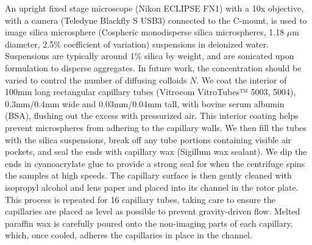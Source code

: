 An upright fixed stage microscope (Nikon ECLIPSE FN1) with a 10x objective, with a camera (Teledyne Blackfly S USB3) connected to the C-mount, is used to image silica microsphere (Cospheric monodisperse silica microspheres, 1.18 $\mu$m diameter, 2.5\% coefficient of variation) suspensions in deionized water. Suspensions are typically around 1\% silica by weight, and are sonicated upon formulation to disperse aggregates. In future work, the concentration should be varied to control the number of diffusing colloids $N$. We coat the interior of 100mm long rectangular capillary tubes (Vitrocom VitroTubes™ 5003, 5004), 0.3mm/0.4mm wide and 0.03mm/0.04mm tall, with bovine serum albumin (BSA), flushing out the excess with pressurized air. This interior coating helps prevent  microspheres from adhering to the capillary walls. We then fill the tubes with the silica suspensions, break off any tube portions containing visible air pockets, and seal the ends with capillary wax (Sigillum wax sealant). We dip the ends in cyanoacrylate glue to provide a strong seal for when the centrifuge spins the samples at high speeds. The capillary surface is then gently cleaned with isopropyl alcohol and lens paper and placed into its channel in the rotor plate. This process is repeated for 16 capillary tubes, taking care to ensure the capillaries are placed as level as possible to prevent gravity-driven flow. Melted paraffin wax is carefully poured onto the non-imaging parts of each capillary, which, once cooled, adheres the capillaries in place in the channel.


